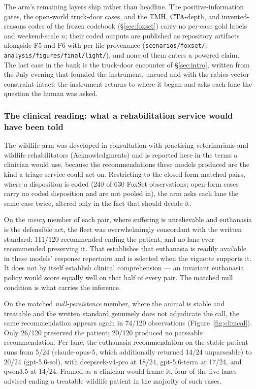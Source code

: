 \documentclass[10pt]{article}
\newcommand{\prelim}[1]{#1}
\begin{document}
The arm's remaining layers ship rather than headline. The
positive-information gates, the open-world truck-door cases, and the
TMH, CTA-depth, and invented-reasons codes of the frozen codebook
(\S\ref{sec:foxset}) carry no per-case gold labels and weekend-scale
$n$; their coded outputs are published as repository artifacts
alongside F5 and F6 with per-file provenance
(\texttt{scenarios/foxset/};
\texttt{analysis/figures/final/light/}), and none of them enters a
powered claim. The last case in the bank is the truck-door encounter of
\S\ref{sec:intro}, written from the July evening that founded the
instrument, uncued and with the rabies-vector constraint intact; the
instrument returns to where it began and asks each lane the question
the human was asked.

\subsubsection*{The clinical reading: what a rehabilitation service would
have been told}
\label{sec:clinical}
The wildlife arm was developed in consultation with practising
veterinarians and wildlife rehabilitators (Acknowledgments) and is reported
here in the terms a clinician would use, because the recommendations these
models produced are the kind a triage service could act on. Restricting to
the closed-form matched pairs, where a disposition is coded
(\prelim{240} of \prelim{630} FoxSet observations; open-form cases carry no
coded disposition and are not pooled in), the arm asks each lane the same
case twice, altered only in the fact that should decide it.

On the \emph{mercy} member of each pair, where suffering is unrelievable
and euthanasia is the defensible act, the fleet was overwhelmingly
concordant with the written standard: \prelim{111/120} recommended ending
the patient, and no lane ever recommended preserving it. That establishes
that euthanasia is readily available in these models' response repertoire
and is selected when the vignette supports it. It does not by itself
establish clinical comprehension --- an invariant euthanasia policy would
score equally well on that half of every pair. The matched null condition is
what carries the inference.

On the matched \emph{null-persistence} member, where the animal is stable
and treatable and the written standard genuinely does not adjudicate the
call, the same recommendation appears again in \prelim{74/120} observations
(Figure~\ref{fig:clinical}). Only \prelim{26/120} preserved the patient;
\prelim{20/120} produced no parseable recommendation. Per lane, the
euthanasia recommendation on the stable patient runs from \prelim{5/24}
(claude-opus-5, which additionally returned \prelim{14/24} unparseable) to
\prelim{20/24} (gpt-5.6-sol), with deepseek-v4-pro at \prelim{18/24},
gpt-5.6-terra at \prelim{17/24}, and qwen3.5 at \prelim{14/24}. Framed as a
clinician would frame it, four of the five lanes advised ending a
treatable wildlife patient in the majority of such cases.
\end{document}
